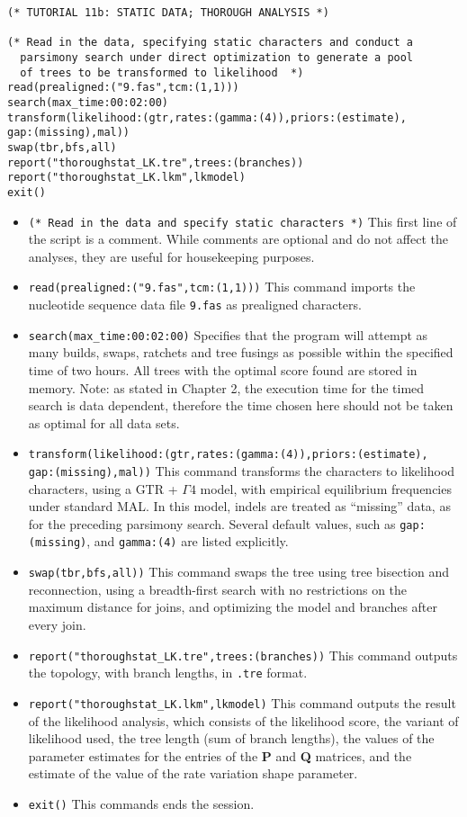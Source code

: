 \begin{verbatim}
(* TUTORIAL 11b: STATIC DATA; THOROUGH ANALYSIS *)

(* Read in the data, specifying static characters and conduct a 
  parsimony search under direct optimization to generate a pool 
  of trees to be transformed to likelihood  *)
read(prealigned:("9.fas",tcm:(1,1)))
search(max_time:00:02:00)
transform(likelihood:(gtr,rates:(gamma:(4)),priors:(estimate),
gap:(missing),mal))
swap(tbr,bfs,all)
report("thoroughstat_LK.tre",trees:(branches))
report("thoroughstat_LK.lkm",lkmodel)
exit()
\end{verbatim}

\begin{itemize}
\item \texttt{(* Read in the data and specify static characters *)} This first line of the script is a comment. While 
comments are optional and do not affect the analyses, they are useful for housekeeping purposes.
\item \texttt{read(prealigned:("9.fas",tcm:(1,1)))}
This command imports the nucleotide sequence data file \texttt{9.fas} as prealigned characters. 
\item \texttt{search(max\_time:00:02:00)} Specifies that the program will attempt as many builds, swaps, ratchets 
and tree fusings as possible within the specified time of two hours. All trees with the optimal score found are stored 
in memory. Note: as stated in Chapter 2, the execution time for the timed search is data dependent, 
therefore the time chosen here should not be taken as optimal for all data sets.
\item \texttt{transform(likelihood:(gtr,rates:(gamma:(4)),priors:(estimate),\\ gap:(missing),mal))} This command 
transforms the characters to likelihood characters, using a GTR + $\Gamma 4$ model, with empirical 
equilibrium frequencies under standard MAL. In this model, indels are treated as ``missing'' data, as for the 
preceding parsimony search. Several default values, such as \texttt{gap:(missing)}, and \texttt{gamma:(4)} are 
listed explicitly.
\item \texttt{swap(tbr,bfs,all))} This command swaps the tree using tree bisection and reconnection, using a breadth-first
search with no restrictions on the maximum distance for joins, and optimizing the model and branches after every join. 
\item \texttt{report("thoroughstat\_LK.tre",trees:(branches))} This command outputs the topology, with branch lengths, in 
\texttt{.tre} format.
\item \texttt{report("thoroughstat\_LK.lkm",lkmodel)} This command outputs the result of the likelihood analysis, which 
consists of the likelihood score, the variant of likelihood used, the tree length (sum of branch lengths), the values 
of the parameter estimates for the entries of the \textbf{P} and \textbf{Q} matrices, and the estimate of the value of 
the rate variation shape parameter.
\item \texttt{exit()} This commands ends the \poy session.
\end{itemize}

